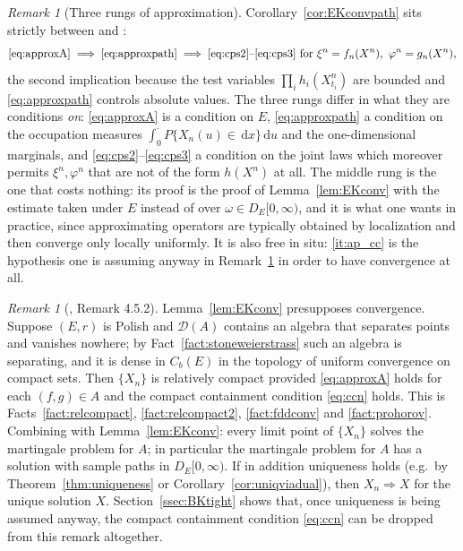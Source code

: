 \documentclass[11pt,a4paper]{article}
\theoremstyle{plain}
\theoremstyle{definition}
\theoremstyle{remark}
\newtheorem{remark}[theorem]{Remark}
\newcommand{\Cb}{C_b}                          %
\newcommand{\DE}{D_E[0,\infty)}
\newcommand{\dom}{\mathcal{D}}                 %
\newcommand{\dif}{\,\mathrm{d}}
\DeclareMathOperator*{\wto}{\Rightarrow}
\newcommand{\EK}{\cite{EK86}}
\newcommand{\CPS}{\cite{CPS23}}
\begin{document}
\begin{remark}[Three rungs of approximation]
  \label{rem:approxladder}
  Corollary~\ref{cor:EKconvpath} sits strictly between \EK{} and \CPS:
  \[
    \eqref{eq:approxA} \;\Longrightarrow\; \eqref{eq:approxpath}
      \;\Longrightarrow\; \eqref{eq:cps2}\text{--}\eqref{eq:cps3}
      \ \text{for } \xi^n = f_n(X^n), \ \varphi^n = g_n(X^n) ,
  \]
  the second implication because the test variables $\prod_i h_i(X^n_{t_i})$ are
  bounded and \eqref{eq:approxpath} controls absolute values.  The three rungs
  differ in what they are conditions \emph{on}:
  \eqref{eq:approxA} is a condition on $E$, \eqref{eq:approxpath} a condition on
  the occupation measures $\int_0^{\cdot} P\{X_n(u) \in \dif x\} \dif u$ and the
  one-dimensional marginals, and \eqref{eq:cps2}--\eqref{eq:cps3} a condition on
  the joint laws which moreover permits $\xi^n, \varphi^n$ that are not of the
  form $h(X^n)$ at all.  The middle rung is the one that costs nothing: its proof
  is the proof of Lemma~\ref{lem:EKconv} with the estimate taken under $E$
  instead of over $\omega \in \DE$, and it is what one wants in practice, since
  approximating operators are typically obtained by localization and then
  converge only locally uniformly.  It is also free in situ: \ref{it:ap_cc} is
  the hypothesis one is assuming anyway in Remark~\ref{rem:EKrelcompact} in order
  to have convergence at all.
\end{remark}

\begin{remark}[\EK, Remark 4.5.2]
  \label{rem:EKrelcompact}
  Lemma~\ref{lem:EKconv} presupposes convergence.  Suppose $(E,r)$ is Polish and
  $\dom(A)$ contains an algebra that separates points and vanishes nowhere; by
  Fact~\ref{fact:stoneweierstrass} such an algebra is separating, and it is dense
  in $\Cb(E)$ in the topology of uniform convergence on compact sets.  Then
  $\{X_n\}$ is relatively compact provided \eqref{eq:approxA} holds for each
  $(f,g) \in A$ and the compact containment condition \eqref{eq:ccn} holds.  This
  is Facts~\ref{fact:relcompact}, \ref{fact:relcompact2},
  \ref{fact:fddconv} and \ref{fact:prohorov}.  Combining with
  Lemma~\ref{lem:EKconv}: every limit point of $\{X_n\}$ solves the martingale
  problem for $A$; in particular the martingale problem for $A$ has a solution
  with sample paths in $\DE$.  If in addition uniqueness holds (e.g.\ by
  Theorem~\ref{thm:uniqueness} or Corollary~\ref{cor:uniqviadual}), then
  $X_n \wto X$ for the unique solution $X$.  Section~\ref{ssec:BKtight} shows
  that, once uniqueness is being assumed anyway, the compact containment
  condition \eqref{eq:ccn} can be dropped from this remark altogether.
\end{remark}
\end{document}
